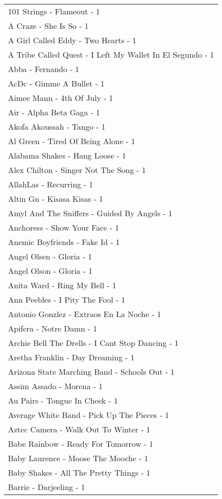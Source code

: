 \documentclass[
]{article}
\begin{document}
\begin{longtable}{l}
101 Strings - Flameout - 1 \\ 
A Craze - She Is So - 1 \\ 
A Girl Called Eddy - Two Hearts - 1 \\ 
A Tribe Called Quest - I Left My Wallet In El Segundo - 1 \\ 
Abba - Fernando - 1 \\ 
AcDc - Gimme A Bullet - 1 \\ 
Aimee Mann - 4th Of July - 1 \\ 
Air - Alpha Beta Gaga - 1 \\ 
Akofa Akoussah - Tango - 1 \\ 
Al Green - Tired Of Being Alone - 1 \\ 
Alabama Shakes - Hang Loose - 1 \\ 
Alex Chilton - Singer Not The Song - 1 \\ 
AllahLas - Recurring - 1 \\ 
Altin Gn - Kisasa Kisas - 1 \\ 
Amyl And The Sniffers - Guided By Angels - 1 \\ 
Anchoress - Show Your Face - 1 \\ 
Anemic Boyfriends - Fake Id - 1 \\ 
Angel Olsen - Gloria - 1 \\ 
Angel Olson - Gloria - 1 \\ 
Anita Ward - Ring My Bell - 1 \\ 
Ann Peebles - I Pity The Fool - 1 \\ 
Antonio Gonzlez - Extraos En La Noche - 1 \\ 
Apifera - Notre Damn - 1 \\ 
Archie Bell The Drells - I Cant Stop Dancing - 1 \\ 
Aretha Franklin - Day Dreaming - 1 \\ 
Arizona State Marching Band - Schools Out - 1 \\ 
Assim Assado - Morena - 1 \\ 
Au Pairs - Tongue In Cheek - 1 \\ 
Average White Band - Pick Up The Pieces - 1 \\ 
Aztec Camera - Walk Out To Winter - 1 \\ 
Babe Rainbow - Ready For Tomorrow - 1 \\ 
Baby Laurence - Moose The Mooche - 1 \\ 
Baby Shakes - All The Pretty Things - 1 \\ 
Barrie - Darjeeling - 1 \\ 

\end{longtable}
\end{document}
